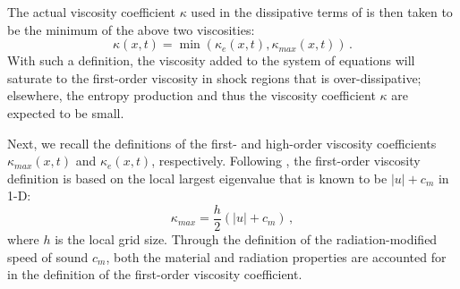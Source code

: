 \documentclass[times,doublespace]{fldauth}%
\begin{document}
The actual viscosity coefficient $\kappa$ used in the dissipative terms of  is then taken to be the minimum of the above two viscosities:  
%
\begin{equation}
\kappa(x,t) = \min ( \kappa_e(x,t), \kappa_{max}(x,t) ) \, . 
\end{equation}
%
With such a definition, the viscosity added to the system of equations will saturate to the first-order viscosity in shock regions that is over-dissipative; elsewhere, the entropy production and thus the viscosity coefficient $\kappa$ are expected to be small.

Next, we recall the definitions of the first- and high-order viscosity coefficients $\kappa_{max}(x,t)$ and $\kappa_e(x,t)$, respectively. Following \cite{our_jcp_radhy_paper}, the first-order viscosity definition is based on the local largest eigenvalue that is known to be $|u| + c_m$ in 1-D:
%
\begin{equation}
\label{eq:equation8}
\kappa_{max} = \frac{h}{2} \left( |u| + c_m \right) \,,
\end{equation}  
%
where $h$ is the local grid size. Through the definition of the radiation-modified speed of sound $c_m$, both the material and radiation properties are accounted for in the definition of the first-order viscosity coefficient. 
\end{document}
